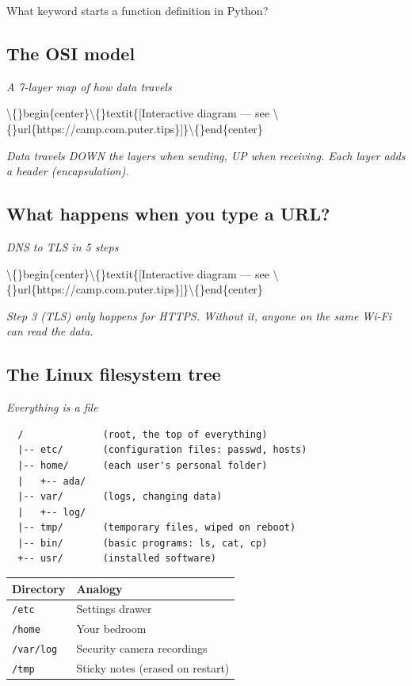 \documentclass[12pt,openany]{book}
\begin{document}
What keyword starts a function definition in Python?

\medskip

\subsection*{The OSI model}
{\small\itshape\color{gray}A 7-layer map of how data travels}

\textbackslash\{\}begin\{center\}\textbackslash\{\}textit\{[Interactive diagram --- see \textbackslash\{\}url\{https://camp.com.puter.tips\}]\}\textbackslash\{\}end\{center\}


{\small\itshape\color{gray}Data travels DOWN the layers when sending, UP when receiving. Each layer adds a header (encapsulation).}

\medskip

\subsection*{What happens when you type a URL?}
{\small\itshape\color{gray}DNS to TLS in 5 steps}

\textbackslash\{\}begin\{center\}\textbackslash\{\}textit\{[Interactive diagram --- see \textbackslash\{\}url\{https://camp.com.puter.tips\}]\}\textbackslash\{\}end\{center\}


{\small\itshape\color{gray}Step 3 (TLS) only happens for HTTPS. Without it, anyone on the same Wi-Fi can read the data.}

\medskip

\subsection*{The Linux filesystem tree}
{\small\itshape\color{gray}Everything is a file}

\begin{lstlisting}
  /              (root, the top of everything)
  |-- etc/       (configuration files: passwd, hosts)
  |-- home/      (each user's personal folder)
  |   +-- ada/
  |-- var/       (logs, changing data)
  |   +-- log/
  |-- tmp/       (temporary files, wiped on reboot)
  |-- bin/       (basic programs: ls, cat, cp)
  +-- usr/       (installed software)\end{lstlisting}


\begin{center}\small\begin{tabular}{p{6.5cm}p{6.5cm}}\toprule
\textbf{Directory} & \textbf{Analogy} \\ \midrule
\texttt{/etc} & Settings drawer \\
\texttt{/home} & Your bedroom \\
\texttt{/var/log} & Security camera recordings \\
\texttt{/tmp} & Sticky notes (erased on restart) \\
\bottomrule\end{tabular}\end{center}
\end{document}
